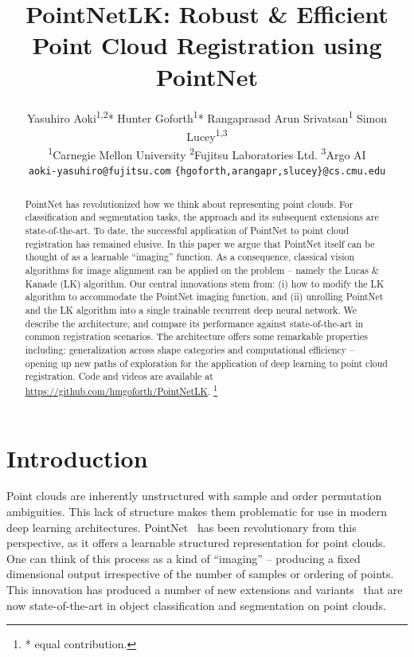 \documentclass[10pt,twocolumn,letterpaper]{article}
\newcommand\blfootnote[1]{\begingroup
  \renewcommand\thefootnote{}\footnote{#1}\addtocounter{footnote}{-1}\endgroup
}
\begin{document}
\title{PointNetLK: Robust \& Efficient Point Cloud Registration using PointNet}

\author{Yasuhiro Aoki\textsuperscript{1,2}* \qquad Hunter Goforth\textsuperscript{1}* \qquad Rangaprasad Arun Srivatsan\textsuperscript{1} \qquad Simon Lucey\textsuperscript{1,3} \\
\textsuperscript{1}Carnegie Mellon University \qquad \textsuperscript{2}Fujitsu Laboratories Ltd. \qquad \textsuperscript{3}Argo AI \\
{ \tt\small aoki-yasuhiro@fujitsu.com} \qquad \tt\small \{hgoforth,arangapr,slucey\}@cs.cmu.edu}


\maketitle
\thispagestyle{empty}

\begin{abstract}
PointNet has revolutionized how we think about representing point clouds. For classification and segmentation tasks, the approach and its subsequent extensions are state-of-the-art. To date, the successful application of PointNet to point cloud registration has remained elusive. In this paper we argue that PointNet itself can be thought of as a learnable ``imaging'' function. As a consequence, classical vision algorithms for image alignment can be applied on the problem -- namely the Lucas \& Kanade (LK) algorithm. Our central innovations stem from: (i) how to modify the LK algorithm to accommodate the PointNet imaging function, and (ii) unrolling PointNet and the LK algorithm into a single trainable recurrent deep neural network. We describe the architecture, and compare its performance against state-of-the-art in common registration scenarios. The architecture offers some remarkable properties including: generalization across shape categories and computational efficiency -- opening up new paths of exploration for the application of deep learning to point cloud registration. Code and videos are available at \url{https://github.com/hmgoforth/PointNetLK}. \blfootnote{* equal contribution.}
\end{abstract}



\section{Introduction}
Point clouds are inherently unstructured with sample and order permutation ambiguities. This lack of structure makes them problematic for use in modern deep learning architectures. PointNet~\cite{qi2017pointnet} has been revolutionary from this perspective, as it offers a learnable structured representation for point clouds. One can think of this process as a kind of ``imaging'' -- producing a fixed dimensional output irrespective of the number of samples or ordering of points. This innovation has produced a number of new extensions and variants~\cite{qi2017pointnet++, shen2017neighbors,wang2018dynamic} that are now state-of-the-art in object classification and segmentation on point clouds.
\end{document}
